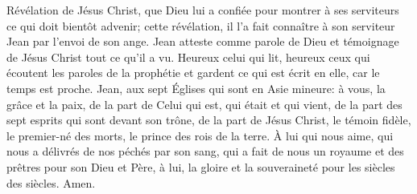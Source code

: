 Révélation de Jésus Christ,
	que Dieu lui a confiée
		pour montrer à ses serviteurs ce qui doit bientôt advenir;
	cette révélation, il l’a fait connaître à son serviteur Jean
		par l’envoi de son ange.
Jean atteste comme parole de Dieu et témoignage de Jésus Christ
	tout ce qu’il a vu.
Heureux celui qui lit,
	heureux ceux qui écoutent les paroles de la prophétie
		et gardent ce qui est écrit en elle,
	car le temps est proche.
Jean, aux sept Églises qui sont en Asie mineure:
	à vous, la grâce et la paix,
	de la part de Celui qui est, qui était et qui vient,
	de la part des sept esprits qui sont devant son trône,
	de la part de Jésus Christ, le témoin fidèle,
	le premier-né des morts, le prince des rois de la terre.
À lui qui nous aime, qui nous a délivrés de nos péchés par son sang,
	qui a fait de nous un royaume et des prêtres pour son Dieu et Père,
	à lui, la gloire et la souveraineté pour les siècles des siècles. Amen.
